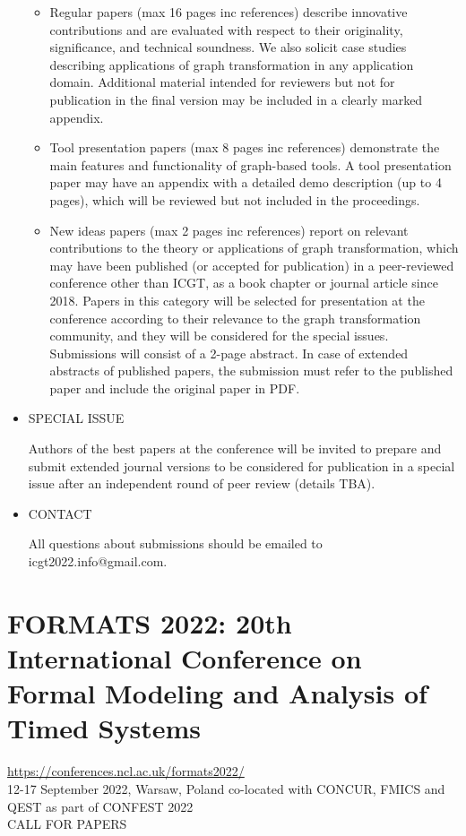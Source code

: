 \documentclass[prodmode,acmtecs]{acmsmall} %
\begin{document}
\begin{itemize}
\begin{itemize}\item  Regular papers (max 16 pages inc references) describe innovative contributions and are evaluated with respect to their originality, significance, and technical soundness. We also solicit case studies describing applications of graph transformation in any application domain. Additional material intended for reviewers but not for publication in the final version may be included in a clearly marked appendix.
\item  Tool presentation papers (max 8 pages inc references) demonstrate the main features and functionality of graph-based tools. A tool presentation paper may have an appendix with a detailed demo description (up to 4 pages), which will be reviewed but not included in the proceedings.
\item  New ideas papers (max 2 pages inc references) report on relevant contributions to the theory or applications of graph transformation, which may have been published (or accepted for publication) in a peer-reviewed conference other than ICGT, as a book chapter or journal article since 2018. Papers in this category will be selected for presentation at the conference according to their relevance to the graph transformation community, and they will be considered for the special issues. Submissions will consist of a 2-page abstract. In case of extended abstracts of published papers, the submission must refer to the published paper and include the original paper in PDF.
\end{itemize} 
\item  SPECIAL ISSUE 
 
  Authors of the best papers at the conference will be invited to prepare and submit extended journal versions to be considered for publication in a special issue after an independent round of peer review (details TBA). 
 
\item  CONTACT 
 
  All questions about submissions should be emailed to icgt2022.info@gmail.com. 
 
\end{itemize}\section{FORMATS 2022: 20th International Conference on Formal Modeling and Analysis of Timed Systems}\label{FORMATS2022}  \href{https://conferences.ncl.ac.uk/formats2022/}{https://conferences.ncl.ac.uk/formats2022/}\\ 
  12-17 September 2022, Warsaw, Poland co-located with CONCUR, FMICS and QEST as part of CONFEST 2022\\ 
CALL FOR PAPERS 
\end{document}
